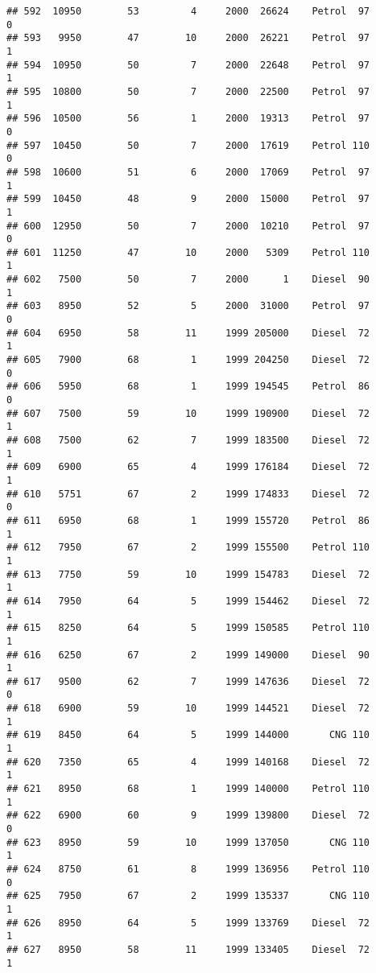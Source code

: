 \documentclass[]{article}
\begin{document}
\begin{verbatim}
## 592  10950        53         4     2000  26624    Petrol  97         0
## 593   9950        47        10     2000  26221    Petrol  97         1
## 594  10950        50         7     2000  22648    Petrol  97         1
## 595  10800        50         7     2000  22500    Petrol  97         1
## 596  10500        56         1     2000  19313    Petrol  97         0
## 597  10450        50         7     2000  17619    Petrol 110         0
## 598  10600        51         6     2000  17069    Petrol  97         1
## 599  10450        48         9     2000  15000    Petrol  97         1
## 600  12950        50         7     2000  10210    Petrol  97         0
## 601  11250        47        10     2000   5309    Petrol 110         1
## 602   7500        50         7     2000      1    Diesel  90         1
## 603   8950        52         5     2000  31000    Petrol  97         0
## 604   6950        58        11     1999 205000    Diesel  72         1
## 605   7900        68         1     1999 204250    Diesel  72         0
## 606   5950        68         1     1999 194545    Petrol  86         0
## 607   7500        59        10     1999 190900    Diesel  72         1
## 608   7500        62         7     1999 183500    Diesel  72         1
## 609   6900        65         4     1999 176184    Diesel  72         1
## 610   5751        67         2     1999 174833    Diesel  72         0
## 611   6950        68         1     1999 155720    Petrol  86         1
## 612   7950        67         2     1999 155500    Petrol 110         1
## 613   7750        59        10     1999 154783    Diesel  72         1
## 614   7950        64         5     1999 154462    Diesel  72         1
## 615   8250        64         5     1999 150585    Petrol 110         1
## 616   6250        67         2     1999 149000    Diesel  90         1
## 617   9500        62         7     1999 147636    Diesel  72         0
## 618   6900        59        10     1999 144521    Diesel  72         1
## 619   8450        64         5     1999 144000       CNG 110         1
## 620   7350        65         4     1999 140168    Diesel  72         1
## 621   8950        68         1     1999 140000    Petrol 110         1
## 622   6900        60         9     1999 139800    Diesel  72         0
## 623   8950        59        10     1999 137050       CNG 110         1
## 624   8750        61         8     1999 136956    Petrol 110         0
## 625   7950        67         2     1999 135337       CNG 110         1
## 626   8950        64         5     1999 133769    Diesel  72         1
## 627   8950        58        11     1999 133405    Diesel  72         1

\end{verbatim}
\end{document}
